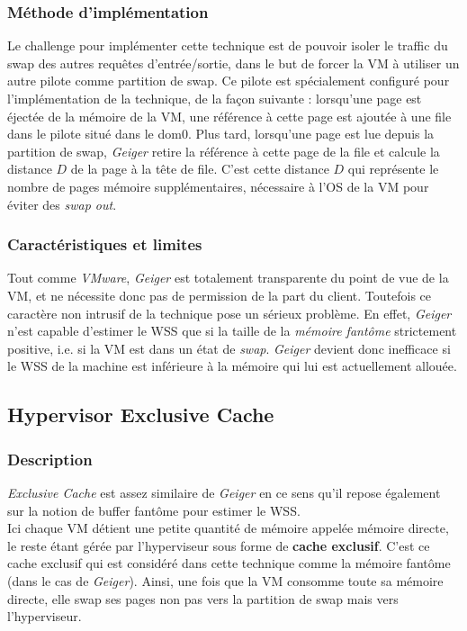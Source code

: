 \subsubsection{Méthode d'implémentation}
Le challenge pour implémenter cette technique est de pouvoir isoler le traffic du swap des autres requêtes d'entrée/sortie, dans le but de forcer la VM à utiliser un autre pilote comme partition de swap. Ce pilote est spécialement configuré pour l'implémentation de la technique, de la façon suivante : lorsqu'une page est éjectée de la mémoire de la VM, une référence à cette page est ajoutée à une file dans le pilote situé dans le dom0. Plus tard, lorsqu'une page est lue depuis la partition de swap, \textit{Geiger} retire la référence à cette page de la file et calcule la distance $D$ de la page à la tête de file. C'est cette distance $D$ qui représente le nombre de pages mémoire supplémentaires, nécessaire à l'OS de la VM pour éviter des \textit{swap out}.

\subsubsection{Caractéristiques et limites}
Tout comme \textit{VMware}, \textit{Geiger} est totalement transparente du point de vue de la VM, et ne nécessite donc pas de permission de la part du client. Toutefois ce caractère non intrusif de la technique pose un sérieux problème. En effet, \textit{Geiger} n'est capable d'estimer le WSS que si la taille de la \textit{mémoire fantôme} strictement positive, i.e. si la VM est dans un état de \textit{swap}. \textit{Geiger} devient donc inefficace si le WSS de la machine est inférieure à la mémoire qui lui est actuellement allouée.

\subsection{Hypervisor Exclusive Cache}

\subsubsection{Description}
\textit{Exclusive Cache} \cite{exclusive_cache} est assez similaire de \textit{Geiger} en ce sens qu'il repose également sur la notion de buffer fantôme pour estimer le WSS.\\
Ici chaque VM détient une petite quantité de mémoire appelée mémoire directe, le reste étant gérée par l'hyperviseur sous forme de \textbf{cache exclusif}. C'est ce cache exclusif qui est considéré dans cette technique comme la mémoire fantôme (dans le cas de \textit{Geiger}). Ainsi, une fois que la VM consomme toute sa mémoire directe, elle swap ses pages non pas vers la partition de swap mais vers l'hyperviseur.

